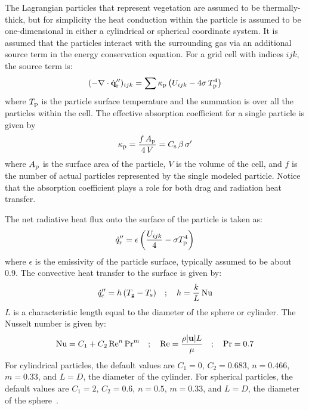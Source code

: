 \documentclass[journal,article,atmosphere,submit,moreauthors,pdftex]{Definitions_Review_Process/mdpi}
\begin{document}
The Lagrangian particles that represent vegetation are assumed to be thermally-thick, but for simplicity the heat conduction within the particle is assumed to be one-dimensional in either a cylindrical or spherical coordinate system. It is assumed that the particles interact with the surrounding gas via an additional source term in the energy conservation equation. For a grid cell with indices $ijk$, the source term is:
\begin{equation} \label{eq:qr}
   (-\nabla \cdot \dot{\mathbf{q}}_{\rm r}'')_{ijk} = \sum \kappa_{\rm p} \left( U_{ijk} - 4 \sigma \, T_{\rm p}^4 \right)
\end{equation}
where $T_{\rm p}$ is the particle surface temperature and the summation is over all the particles within the cell. The effective absorption coefficient for a single particle is given by
\begin{equation}
   \kappa_{\rm p} = \frac{f \, A_{\rm p}}{4 \, V} = C_{\rm s}  \, \beta \, \sigma'
\end{equation}
where $A_{\rm p}$ is the surface area of the particle, $V$ is the volume of the cell, and $f$ is the number of actual particles represented by the single modeled particle. Notice that the absorption coefficient plays a role for both drag and radiation heat transfer.

The net radiative heat flux onto the surface of the particle is taken as:
\begin{equation}
   \dot{q}_{\rm r}'' = \epsilon \left( \frac{U_{ijk}}{4} - \sigma T_{\rm p}^4 \right)
\end{equation}
where $\epsilon$ is the emissivity of the particle surface, typically assumed to be about 0.9. The convective heat transfer to the surface is given by:
\begin{equation}
   \dot{q}_{\rm c}'' = h \, (T_{\rm g} - T_{\rm s})  \quad ; \quad  h = \frac{k}{L} \, \hbox{Nu}  \label{q_con}
\end{equation} 
$L$ is a characteristic length equal to the diameter of the sphere or cylinder. The Nusselt number is given by:
\begin{equation}
   \hbox{Nu} = C_1 + C_2 \, \hbox{Re}^n \, \hbox{Pr}^m  \quad ; \quad \hbox{Re} = \frac{\rho |\mathbf{u}| L}{\mu} \quad ; \quad \hbox{Pr} = 0.7 
\end{equation}
For cylindrical particles, the default values are $C_1=0$, $C_2=0.683$, $n=0.466$, $m=0.33$, and $L=D$, the diameter of the cylinder. For spherical particles, the default values are $C_1=2$, $C_2=0.6$, $n=0.5$, $m=0.33$, and $L=D$, the diameter of the sphere~\cite{Incropera:1}.
\end{document}

